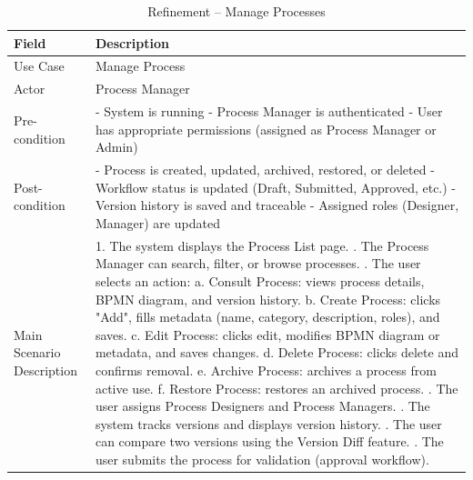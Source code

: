 \begin{table}[H]
\centering
\caption{Refinement -- Manage Processes}
\label{tab:refinement-process}
\begin{tabular}{|p{3cm}|p{12cm}|}
\hline
\textbf{Field} & \textbf{Description} \\
\hline
Use Case & Manage Process \\
\hline
Actor & Process Manager \\
\hline
Pre-condition & 
- System is running \newline
- Process Manager is authenticated \newline
- User has appropriate permissions (assigned as Process Manager or Admin) \\
\hline
Post-condition & 
- Process is created, updated, archived, restored, or deleted \newline
- Workflow status is updated (Draft, Submitted, Approved, etc.) \newline
- Version history is saved and traceable \newline
- Assigned roles (Designer, Manager) are updated \\
\hline
Main Scenario Description & 
1. The system displays the Process List page. \newline
2. The Process Manager can search, filter, or browse processes. \newline
3. The user selects an action: \newline
   a. Consult Process: views process details, BPMN diagram, and version history. \newline
   b. Create Process: clicks "Add", fills metadata (name, category, description, roles), and saves. \newline
   c. Edit Process: clicks edit, modifies BPMN diagram or metadata, and saves changes. \newline
   d. Delete Process: clicks delete and confirms removal. \newline
   e. Archive Process: archives a process from active use. \newline
   f. Restore Process: restores an archived process. \newline
4. The user assigns Process Designers and Process Managers. \newline
5. The system tracks versions and displays version history. \newline
6. The user can compare two versions using the Version Diff feature. \newline
7. The user submits the process for validation (approval workflow). \newline

\end{tabular}
\end{table}

